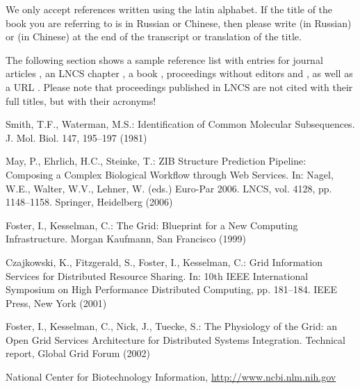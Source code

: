 \documentclass[runningheads,a4paper]{llncs}
\begin{document}
We only accept references written using the latin alphabet. If the title
of the book you are referring to is in Russian or Chinese, then please write
(in Russian) or (in Chinese) at the end of the transcript or translation
of the title.

The following section shows a sample reference list with entries for
journal articles \cite{jour}, an LNCS chapter \cite{lncschap}, a book
\cite{book}, proceedings without editors \cite{proceeding1} and
\cite{proceeding2}, as well as a URL \cite{url}.
Please note that proceedings published in LNCS are not cited with their
full titles, but with their acronyms!

\begin{thebibliography}{4}

 Smith, T.F., Waterman, M.S.: Identification of Common Molecular
Subsequences. J. Mol. Biol. 147, 195--197 (1981)

 May, P., Ehrlich, H.C., Steinke, T.: ZIB Structure Prediction Pipeline:
Composing a Complex Biological Workflow through Web Services. In: Nagel,
W.E., Walter, W.V., Lehner, W. (eds.) Euro-Par 2006. LNCS, vol. 4128,
pp. 1148--1158. Springer, Heidelberg (2006)

 Foster, I., Kesselman, C.: The Grid: Blueprint for a New Computing
Infrastructure. Morgan Kaufmann, San Francisco (1999)

 Czajkowski, K., Fitzgerald, S., Foster, I., Kesselman, C.: Grid
Information Services for Distributed Resource Sharing. In: 10th IEEE
International Symposium on High Performance Distributed Computing, pp.
181--184. IEEE Press, New York (2001)

 Foster, I., Kesselman, C., Nick, J., Tuecke, S.: The Physiology of the
Grid: an Open Grid Services Architecture for Distributed Systems
Integration. Technical report, Global Grid Forum (2002)

 National Center for Biotechnology Information, \url{http://www.ncbi.nlm.nih.gov}

\end{thebibliography}
\end{document}
